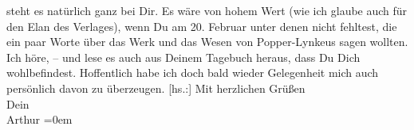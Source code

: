 \begin{ledgroupsized}[t]{13cm}
               steht es natürlich ganz bei Dir. Es wäre von hohem Wert (wie ich glaube auch für den
               Elan des Verlages), wenn Du am 20. Februar unter denen nicht fehltest,
               die ein paar Worte über das Werk und das Wesen von Popper-Lynkeus sagen wollten.\pend
           \pstart
           Ich höre\introOben{}, –\introOben{} und lese es auch aus Deinem Tagebuch heraus, dass Du Dich wohlbefindest. Hoffentlich habe ich
               doch bald wieder Gelegenheit mich auch persönlich davon zu überzeugen.\pend
           \pstart
           {[}hs.:{]} Mit herzlichen Grüßen{\\[\baselineskip]}Dein{\\[\baselineskip]}\spacefill\mbox{Arthur}\pend
           \leftskip=0em{}\endnumbering{}\end{ledgroupsized}  \newcommand{\dateiname}{L02360}\newcommand{\titel}{Arthur Schnitzler an Hermann Bahr, 7. 2. 1921}\newcommand{\editorInnen}{ Kurt Ifkovits,  Martin Anton Müller}
      
